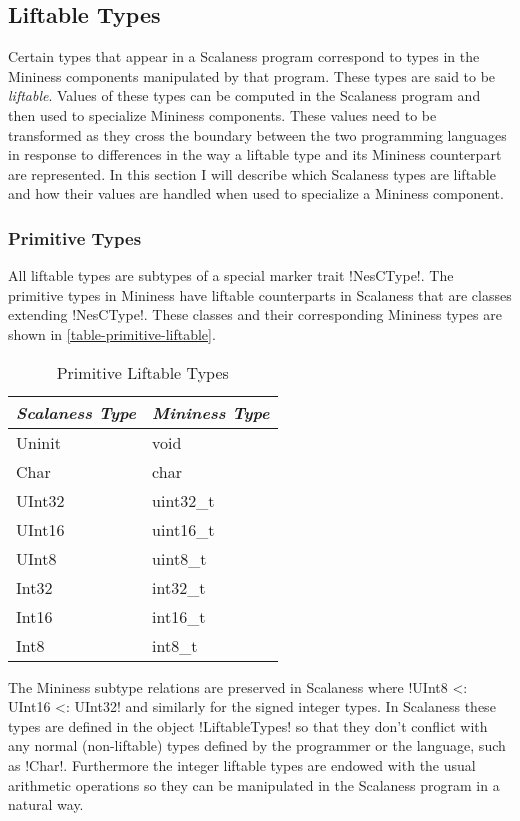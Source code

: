 \subsection{Liftable Types}
\label{section-liftable-types-design}

Certain types that appear in a Scalaness program correspond to types in the Mininess components
manipulated by that program. These types are said to be \textit{liftable}. Values of these types
can be computed in the Scalaness program and then used to specialize Mininess components. These
values need to be transformed as they cross the boundary between the two programming languages
in response to differences in the way a liftable type and its Mininess counterpart are
represented. In this section I will describe which Scalaness types are liftable and how their
values are handled when used to specialize a Mininess component.

\subsubsection{Primitive Types}
\label{section-primitive-types-design}

All liftable types are subtypes of a special marker trait !NesCType!. The primitive types in
Mininess have liftable counterparts in Scalaness that are classes extending !NesCType!. These
classes and their corresponding Mininess types are shown in \autoref{table-primitive-liftable}.

\begin{table}
  \centering
  \caption{Primitive Liftable Types}
  \label{table-primitive-liftable}
  \begin{tabular}{|l|l|} \hline
    \textit{Scalaness Type} & \textit{Mininess Type} \\ \hline
    Uninit & void      \\ \hline
    Char   & char      \\ \hline
    UInt32 & uint32\_t \\ \hline
    UInt16 & uint16\_t \\ \hline
    UInt8  & uint8\_t  \\ \hline
    Int32  & int32\_t  \\ \hline
    Int16  & int16\_t  \\ \hline
    Int8   & int8\_t   \\ \hline
  \end{tabular}
\end{table}

The Mininess subtype relations are preserved in Scalaness where !UInt8 <: UInt16 <: UInt32! and
similarly for the signed integer types. In Scalaness these types are defined in the object
!LiftableTypes! so that they don't conflict with any normal (non-liftable) types defined by the
programmer or the language, such as !Char!. Furthermore the integer liftable types are endowed
with the usual arithmetic operations so they can be manipulated in the Scalaness program in a
natural way.

